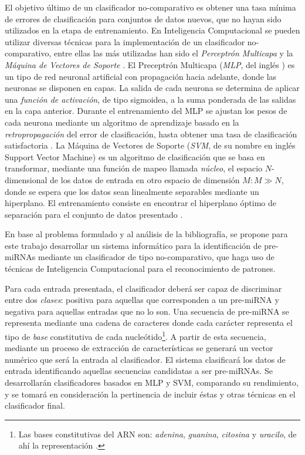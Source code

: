 \documentclass[12pt,bibliography=oldstyle,DIV=12,parskip=full-,titlepage]{scrartcl}
\begin{document}
El objetivo último de un clasificador no-comparativo es obtener una
tasa mínima de errores de clasificación para conjuntos de datos
nuevos, que no hayan sido utilizados en la etapa de entrenamiento.  En
Inteligencia Computacional se pueden utilizar diversas técnicas para
la implementación de un clasificador no-comparativo, entre ellas las
más utilizadas han sido el \emph{Perceptrón Multicapa}
\cite{mlp1}\cite{mlp2} y la \emph{Máquina de Vectores de Soporte}
\cite{svm}.  El Preceptrón Multicapa (\emph{MLP}, del inglés
) es un tipo de red neuronal artificial con
propagación hacia adelante, donde las neuronas se disponen en capas.
La salida de cada neurona se determina de aplicar una \emph{función de
  activación}, de tipo sigmoidea, a la suma ponderada de las salidas
en la capa anterior. Durante el entrenamiento del MLP se ajustan los
pesos de cada neurona mediante un algoritmo de aprendizaje basado en
la \emph{retropropagación} del error de clasificación, hasta obtener
una tasa de clasificación satisfactoria \cite{jain}.  La Máquina de
Vectores de Soporte (\emph{SVM}, de su nombre en inglés {Support
  Vector Machine}) es un algoritmo de clasificación que se basa en
transformar, mediante una función de mapeo llamada \emph{núcleo}, el
espacio $N$-dimensional de los datos de entrada en otro espacio de
dimensión $M: M\gg N$, donde se espera que los datos sean linealmente
separables mediante un hiperplano. El entrenamiento consiste en
encontrar el hiperplano óptimo de separación para el conjunto de datos
presentado \cite{bottou}.

En base al problema formulado y al análisis de la bibliografía, se
propone para este trabajo desarrollar un sistema informático para la
identificación de pre-miRNAs mediante un clasificador de tipo
no-comparativo, que haga uso de técnicas de Inteligencia Computacional
para el reconocimiento de patrones.

Para cada entrada presentada, el clasificador deberá ser capaz de
discriminar entre dos \emph{clases}: positiva para aquellas que
corresponden a un pre-miRNA y negativa para aquellas entradas que no
lo son. 
Una secuencia de pre-miRNA se representa mediante una cadena de
caracteres  donde cada carácter representa el tipo
de \emph{base} constitutiva de cada nucleótido\footnote{Las bases
  constitutivas del ARN son: \emph{adenina}, \emph{guanina},
  \emph{citosina} y \emph{uracilo}, de ahí la representación .}.
A partir de esta secuencia, mediante un proceso de extracción de
características se generará un vector numérico que será la entrada al
clasificador.  El sistema clasificará los datos de entrada
identificando aquellas secuencias candidatas a ser pre-miRNAs.  Se
desarrollarán clasificadores basados en MLP y SVM, comparando su
rendimiento, y se tomará en consideración la pertinencia de incluir
éstas y otras técnicas en el clasificador final.
\end{document}
